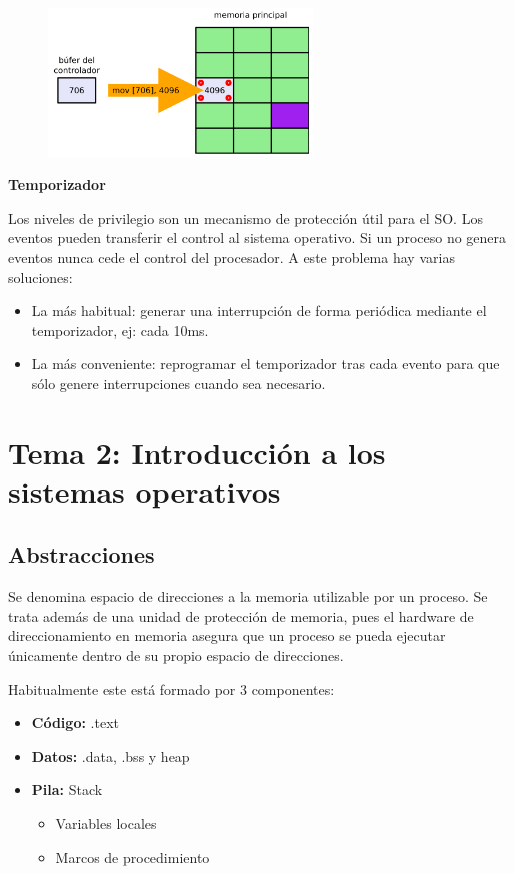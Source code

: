 \documentclass{article}
\begin{document}
\begin{figure}[h]
\centering
\includegraphics[scale=1,width=70mm]{pinning.png}
\end{figure}

\textbf{Temporizador}

Los niveles de privilegio son un mecanismo de protección útil para el SO. Los eventos pueden transferir el control al sistema operativo. Si un proceso no genera eventos nunca cede el control del procesador. A este problema hay varias soluciones:

\begin{itemize}
\item La más habitual: generar una interrupción de forma periódica mediante el temporizador, ej: cada 10ms.

\item La más conveniente: reprogramar el temporizador tras cada evento para que sólo genere interrupciones cuando sea necesario.
\end{itemize}

\section{Tema 2: Introducción a los sistemas operativos}
\subsection{Abstracciones}
Se denomina espacio de direcciones a la memoria utilizable por un proceso. Se trata además de una unidad de protección de memoria, pues el hardware de direccionamiento en memoria asegura que un proceso se pueda ejecutar únicamente dentro de su propio espacio de direcciones.

Habitualmente este está formado por 3 componentes:
\begin{itemize}
\item \textbf{Código:} .text

\item \textbf{Datos:} .data, .bss y heap

\item \textbf{Pila:} Stack
	\begin{itemize}
	\item Variables locales
	\item Marcos de procedimiento
	\end{itemize}
\end{itemize}
\end{document}
